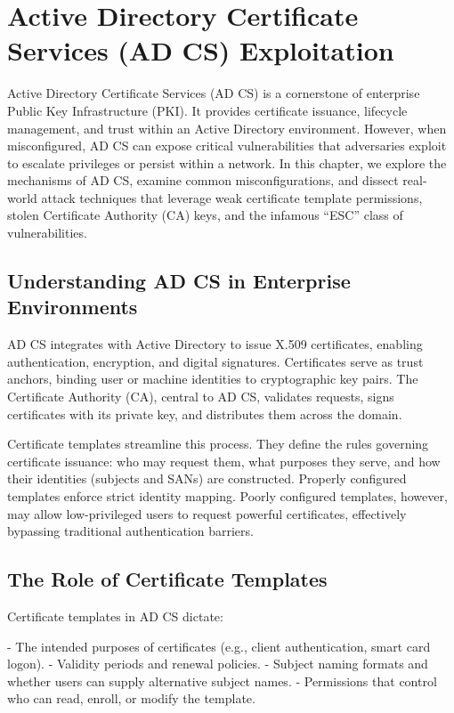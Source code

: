 \chapter{Active Directory Certificate Services (AD CS) Exploitation}

Active Directory Certificate Services (AD CS) is a cornerstone of enterprise Public Key Infrastructure (PKI). It provides certificate issuance, lifecycle management, and trust within an Active Directory environment. However, when misconfigured, AD CS can expose critical vulnerabilities that adversaries exploit to escalate privileges or persist within a network. In this chapter, we explore the mechanisms of AD CS, examine common misconfigurations, and dissect real-world attack techniques that leverage weak certificate template permissions, stolen Certificate Authority (CA) keys, and the infamous “ESC” class of vulnerabilities.

\section{Understanding AD CS in Enterprise Environments}

AD CS integrates with Active Directory to issue X.509 certificates, enabling authentication, encryption, and digital signatures. Certificates serve as trust anchors, binding user or machine identities to cryptographic key pairs. The Certificate Authority (CA), central to AD CS, validates requests, signs certificates with its private key, and distributes them across the domain.

Certificate templates streamline this process. They define the rules governing certificate issuance: who may request them, what purposes they serve, and how their identities (subjects and SANs) are constructed. Properly configured templates enforce strict identity mapping. Poorly configured templates, however, may allow low-privileged users to request powerful certificates, effectively bypassing traditional authentication barriers.

\section{The Role of Certificate Templates}

Certificate templates in AD CS dictate:

- The intended purposes of certificates (e.g., client authentication, smart card logon).
- Validity periods and renewal policies.
- Subject naming formats and whether users can supply alternative subject names.
- Permissions that control who can read, enroll, or modify the template.

